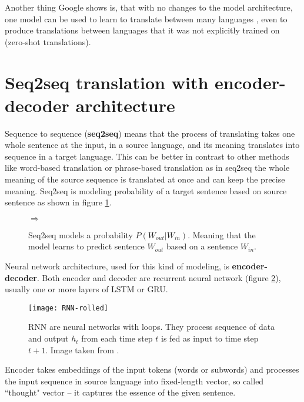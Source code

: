 \documentclass{ExcelAtFIT}
\begin{document}
Another thing Google shows is, that with no changes to the model architecture, one model can be used to learn to translate between many languages \cite{googleMultiLingual}, even to produce translations between languages that it was not explicitly trained on (zero-shot translations).

\section{Seq2seq translation with encoder-decoder architecture}
Sequence to sequence (\textbf{seq2seq}) means that the process of translating takes one whole sentence at the input, in a source language, and its meaning translates into sequence in a target language. This can be better in contrast to other methods like word-based translation or phrase-based translation as in seq2seq the whole meaning of the source sequence is translated at once and can keep the precise meaning. Seq2seq is modeling probability of a target sentence based on source sentence as shown in figure \ref{fig:seqProbability}.

\begin{figure}[h!]
    \begin{center}
        \setlength{\fboxsep}{8pt}
        $\Longrightarrow$
    \end{center}
	\caption{Seq2seq models a probability $P(W_{out}|W_{in})$. Meaning that the model learns to predict sentence $W_{out}$ based on a sentence $W_{in}$.}
	\label{fig:seqProbability}
\end{figure}

Neural network architecture, used for this kind of modeling, is \textbf{encoder-decoder}. Both encoder and decoder are recurrent neural network (figure \ref{fig:rnn}), usually one or more layers of LSTM or GRU.

\begin{figure}[h!]\centering
  \centering
  \texttt{[image: RNN-rolled]}
  \caption{RNN are neural networks with loops. They process sequence of data and output $h_t$ from each time step $t$ is fed as input to time step $t+1$. Image taken from \cite{understandingLSTM}.}
  \label{fig:rnn}
\end{figure}


Encoder takes embeddings of the input tokens (words or subwords) and processes the input sequence in source language into fixed-length vector, so called ``thought" vector -- it captures the essence of the given sentence.
\end{document}
